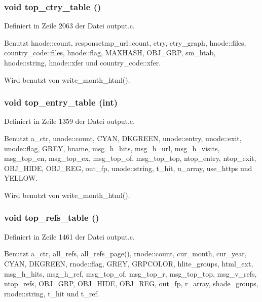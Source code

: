 \subsubsection{\setlength{\rightskip}{0pt plus 5cm}void top\_\-ctry\_\-table ()}\label{output_8c_c1ecb6ecbe9f7218b2e9ccae79cf2f5f}




Definiert in Zeile 2063 der Datei output.c.

Benutzt hnode::count, responsetmp\_\-url::count, ctry, ctry\_\-graph, hnode::files, country\_\-code::files, hnode::flag, MAXHASH, OBJ\_\-GRP, sm\_\-htab, hnode::string, hnode::xfer und country\_\-code::xfer.

Wird benutzt von write\_\-month\_\-html().
\subsubsection{\setlength{\rightskip}{0pt plus 5cm}void top\_\-entry\_\-table (int)}\label{output_8c_72037da3c986417f62837bb8c96b60c0}




Definiert in Zeile 1359 der Datei output.c.

Benutzt a\_\-ctr, unode::count, CYAN, DKGREEN, unode::entry, unode::exit, unode::flag, GREY, hname, msg\_\-h\_\-hits, msg\_\-h\_\-url, msg\_\-h\_\-visits, msg\_\-top\_\-en, msg\_\-top\_\-ex, msg\_\-top\_\-of, msg\_\-top\_\-top, ntop\_\-entry, ntop\_\-exit, OBJ\_\-HIDE, OBJ\_\-REG, out\_\-fp, unode::string, t\_\-hit, u\_\-array, use\_\-https und YELLOW.

Wird benutzt von write\_\-month\_\-html().
\subsubsection{\setlength{\rightskip}{0pt plus 5cm}void top\_\-refs\_\-table ()}\label{output_8c_f175d11f499a6782ad34c4b21f6891e1}




Definiert in Zeile 1461 der Datei output.c.

Benutzt a\_\-ctr, all\_\-refs, all\_\-refs\_\-page(), rnode::count, cur\_\-month, cur\_\-year, CYAN, DKGREEN, rnode::flag, GREY, GRPCOLOR, hlite\_\-groups, html\_\-ext, msg\_\-h\_\-hits, msg\_\-h\_\-ref, msg\_\-top\_\-of, msg\_\-top\_\-r, msg\_\-top\_\-top, msg\_\-v\_\-refs, ntop\_\-refs, OBJ\_\-GRP, OBJ\_\-HIDE, OBJ\_\-REG, out\_\-fp, r\_\-array, shade\_\-groups, rnode::string, t\_\-hit und t\_\-ref.

